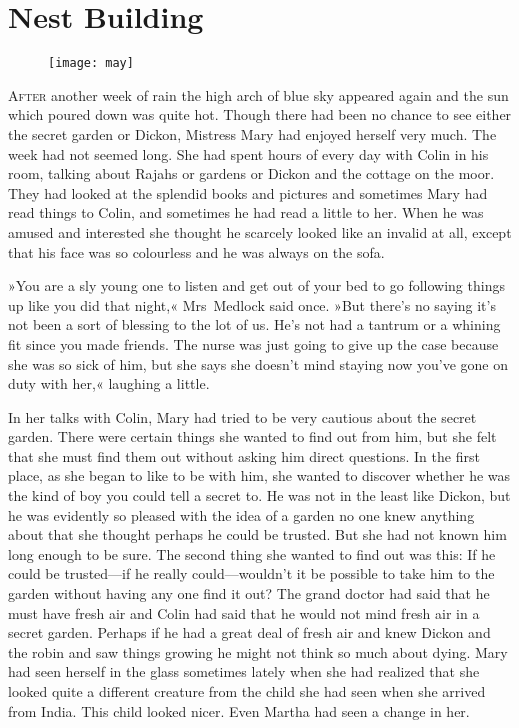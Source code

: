 \chapter{Nest Building} 
	
\begin{figure}[t!]
\centering
\texttt{[image: may]}
\end{figure}

	\lettrine[lines=6]{A}{fter} another week of rain the high arch of blue sky appeared again and the sun which poured down was quite hot. Though there had been no chance to see either the secret garden or Dickon, Mistress Mary had enjoyed herself very much. The week had not seemed long. She had spent hours of every day with Colin in his room, talking about Rajahs or gardens or Dickon and the cottage on the moor. They had looked at the splendid books and pictures and sometimes Mary had read things to Colin, and sometimes he had read a little to her. When he was amused and interested she thought he scarcely looked like an invalid at all, except that his face was so colourless and he was always on the sofa.

»You are a sly young one to listen and get out of your bed to go following things up like you did that night,« Mrs~Medlock said once. »But there's no saying it's not been a sort of blessing to the lot of us. He's not had a tantrum or a whining fit since you made friends. The nurse was just going to give up the case because she was so sick of him, but she says she doesn't mind staying now you've gone on duty with her,« laughing a little.

In her talks with Colin, Mary had tried to be very cautious about the secret garden. There were certain things she wanted to find out from him, but she felt that she must find them out without asking him direct questions. In the first place, as she began to like to be with him, she wanted to discover whether he was the kind of boy you could tell a secret to. He was not in the least like Dickon, but he was evidently so pleased with the idea of a garden no one knew anything about that she thought perhaps he could be trusted. But she had not known him long enough to be sure. The second thing she wanted to find out was this: If he could be trusted—if he really could—wouldn't it be possible to take him to the garden without having any one find it out? The grand doctor had said that he must have fresh air and Colin had said that he would not mind fresh air in a secret garden. Perhaps if he had a great deal of fresh air and knew Dickon and the robin and saw things growing he might not think so much about dying. Mary had seen herself in the glass sometimes lately when she had realized that she looked quite a different creature from the child she had seen when she arrived from India. This child looked nicer. Even Martha had seen a change in her.


